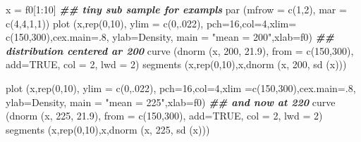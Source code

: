 \documentclass[
]{book}
\newenvironment{Shaded}{\begin{snugshade}}{\end{snugshade}}
\newcommand{\AttributeTok}[1]{\textcolor[rgb]{0.77,0.63,0.00}{#1}}
\newcommand{\ConstantTok}[1]{\textcolor[rgb]{0.00,0.00,0.00}{#1}}
\newcommand{\DecValTok}[1]{\textcolor[rgb]{0.00,0.00,0.81}{#1}}
\newcommand{\DocumentationTok}[1]{\textcolor[rgb]{0.56,0.35,0.01}{\textbf{\textit{#1}}}}
\newcommand{\FloatTok}[1]{\textcolor[rgb]{0.00,0.00,0.81}{#1}}
\newcommand{\FunctionTok}[1]{\textcolor[rgb]{0.00,0.00,0.00}{#1}}
\newcommand{\NormalTok}[1]{#1}
\newcommand{\OtherTok}[1]{\textcolor[rgb]{0.56,0.35,0.01}{#1}}
\newcommand{\SpecialCharTok}[1]{\textcolor[rgb]{0.00,0.00,0.00}{#1}}
\newcommand{\StringTok}[1]{\textcolor[rgb]{0.31,0.60,0.02}{#1}}
\begin{document}
\begin{Shaded}
\begin{Highlighting}[]
\NormalTok{x }\OtherTok{=}\NormalTok{ f0[}\DecValTok{1}\SpecialCharTok{:}\DecValTok{10}\NormalTok{]   }\DocumentationTok{\#\# tiny sub sample for exampls}
\FunctionTok{par}\NormalTok{ (}\AttributeTok{mfrow =} \FunctionTok{c}\NormalTok{(}\DecValTok{1}\NormalTok{,}\DecValTok{2}\NormalTok{), }\AttributeTok{mar =} \FunctionTok{c}\NormalTok{(}\DecValTok{4}\NormalTok{,}\DecValTok{4}\NormalTok{,}\DecValTok{1}\NormalTok{,}\DecValTok{1}\NormalTok{))}
\FunctionTok{plot}\NormalTok{ (x,}\FunctionTok{rep}\NormalTok{(}\DecValTok{0}\NormalTok{,}\DecValTok{10}\NormalTok{), }\AttributeTok{ylim =} \FunctionTok{c}\NormalTok{(}\DecValTok{0}\NormalTok{,.}\DecValTok{022}\NormalTok{), }\AttributeTok{pch=}\DecValTok{16}\NormalTok{,}\AttributeTok{col=}\DecValTok{4}\NormalTok{,}\AttributeTok{xlim=} \FunctionTok{c}\NormalTok{(}\DecValTok{150}\NormalTok{,}\DecValTok{300}\NormalTok{),}\AttributeTok{cex.main=}\NormalTok{.}\DecValTok{8}\NormalTok{, }
      \AttributeTok{ylab=}\StringTok{\textquotesingle{}Density\textquotesingle{}}\NormalTok{, }\AttributeTok{main =} \StringTok{"mean = 200"}\NormalTok{,}\AttributeTok{xlab=}\StringTok{\textquotesingle{}f0\textquotesingle{}}\NormalTok{)}
\DocumentationTok{\#\# distribution centered ar 200}
\FunctionTok{curve}\NormalTok{ (}\FunctionTok{dnorm}\NormalTok{ (x, }\DecValTok{200}\NormalTok{, }\FloatTok{21.9}\NormalTok{), }\AttributeTok{from =} \FunctionTok{c}\NormalTok{(}\DecValTok{150}\NormalTok{,}\DecValTok{300}\NormalTok{), }
       \AttributeTok{add=}\ConstantTok{TRUE}\NormalTok{, }\AttributeTok{col =} \DecValTok{2}\NormalTok{, }\AttributeTok{lwd =} \DecValTok{2}\NormalTok{)}
\FunctionTok{segments}\NormalTok{ (x,}\FunctionTok{rep}\NormalTok{(}\DecValTok{0}\NormalTok{,}\DecValTok{10}\NormalTok{),x,}\FunctionTok{dnorm}\NormalTok{ (x, }\DecValTok{200}\NormalTok{, }\FunctionTok{sd}\NormalTok{ (x)))}

\FunctionTok{plot}\NormalTok{ (x,}\FunctionTok{rep}\NormalTok{(}\DecValTok{0}\NormalTok{,}\DecValTok{10}\NormalTok{), }\AttributeTok{ylim =} \FunctionTok{c}\NormalTok{(}\DecValTok{0}\NormalTok{,.}\DecValTok{022}\NormalTok{), }\AttributeTok{pch=}\DecValTok{16}\NormalTok{,}\AttributeTok{col=}\DecValTok{4}\NormalTok{,}\AttributeTok{xlim =}\FunctionTok{c}\NormalTok{(}\DecValTok{150}\NormalTok{,}\DecValTok{300}\NormalTok{),}\AttributeTok{cex.main=}\NormalTok{.}\DecValTok{8}\NormalTok{, }
      \AttributeTok{ylab=}\StringTok{\textquotesingle{}Density\textquotesingle{}}\NormalTok{, }\AttributeTok{main =} \StringTok{"mean = 225"}\NormalTok{,}\AttributeTok{xlab=}\StringTok{\textquotesingle{}f0\textquotesingle{}}\NormalTok{)}
\DocumentationTok{\#\# and now at 220}
\FunctionTok{curve}\NormalTok{ (}\FunctionTok{dnorm}\NormalTok{ (x, }\DecValTok{225}\NormalTok{, }\FloatTok{21.9}\NormalTok{), }\AttributeTok{from =} \FunctionTok{c}\NormalTok{(}\DecValTok{150}\NormalTok{,}\DecValTok{300}\NormalTok{), }
       \AttributeTok{add=}\ConstantTok{TRUE}\NormalTok{, }\AttributeTok{col =} \DecValTok{2}\NormalTok{, }\AttributeTok{lwd =} \DecValTok{2}\NormalTok{)}
\FunctionTok{segments}\NormalTok{ (x,}\FunctionTok{rep}\NormalTok{(}\DecValTok{0}\NormalTok{,}\DecValTok{10}\NormalTok{),x,}\FunctionTok{dnorm}\NormalTok{ (x, }\DecValTok{225}\NormalTok{, }\FunctionTok{sd}\NormalTok{ (x)))}



\end{Highlighting}
\end{Shaded}
\end{document}
